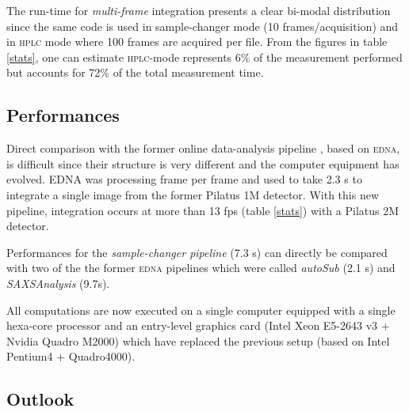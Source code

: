 \documentclass[preprint]{iucr}              %
\begin{document}
The run-time for \textit{multi-frame} integration presents a clear bi-modal distribution since the same code is used in sample-changer mode (10 frames/acquisition) and in \textsc{hplc} mode where 100 frames are acquired per file.
From the figures in table \ref{stats}, one can estimate \textsc{hplc}-mode represents 6\% of the measurement performed but accounts for 72\% of the total measurement time.

\subsection{Performances}
\label{performances}
Direct comparison with the former online data-analysis pipeline \cite{BM29ODA}, based on \textsc{edna}, is difficult since their structure is very different and the computer equipment has evolved.
EDNA was processing frame per frame and used to take 2.3 s to integrate a single image from the former Pilatus 1M detector.
With this new pipeline, integration occurs at more than 13 fps (table \ref{stats}) with a Pilatus 2M detector.

Performances for the \textit{sample-changer pipeline} (7.3 s) can directly be compared with two of the the former \textsc{edna} pipelines which were called \textit{autoSub} (2.1 s) and \textit{SAXSAnalysis} (9.7s).

All computations are now executed on a single computer equipped with a single hexa-core processor and an entry-level graphics card (Intel Xeon E5-2643 v3 + Nvidia Quadro M2000) which have replaced the previous setup (based on Intel Pentium4 + Quadro4000).


\subsection{Outlook}
\end{document}
